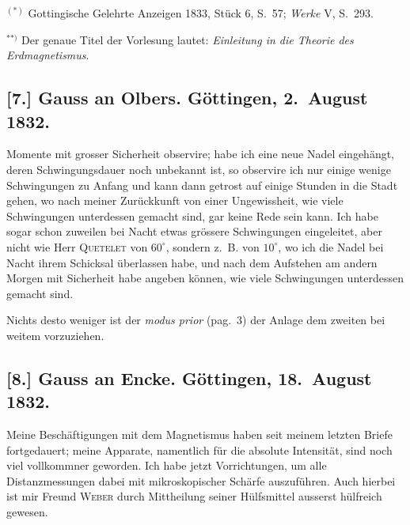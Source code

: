 \documentclass[12pt,a4paper]{article}
\begin{document}
\medskip\noindent
$^{(*)}$ Gottingische Gelehrte Anzeigen 1833, St\"uck 6, S.~57; \textit{Werke} V, S.~293.

$^{**)}$ Der genaue Titel der Vorlesung lautet: \textit{Einleitung in die Theorie des Erdmagnetismus}.

\subsection*{[7.] Gauss an Olbers. G\"ottingen, 2.~August 1832.}

Momente mit grosser Sicherheit observire; habe ich eine neue Nadel eingeh\"angt, deren Schwingungsdauer noch unbekannt ist, so observire ich nur einige wenige Schwingungen zu Anfang und kann dann getrost auf einige Stunden in die Stadt gehen, wo nach meiner Zur\"uckkunft von einer Ungewissheit, wie viele Schwingungen unterdessen gemacht sind, gar keine Rede sein kann. Ich habe sogar schon zuweilen bei Nacht etwas gr\"ossere Schwingungen eingeleitet, aber nicht wie Herr \textsc{Quetelet} von $60^\circ$, sondern z.~B. von $10^\circ$, wo ich die Nadel bei Nacht ihrem Schicksal \"uberlassen habe, und nach dem Aufstehen am andern Morgen mit Sicherheit habe angeben k\"onnen, wie viele Schwingungen unterdessen gemacht sind.

Nichts desto weniger ist der \textit{modus prior} (pag.~3) der Anlage dem zweiten bei weitem vorzuziehen.

\subsection*{[8.] Gauss an Encke. G\"ottingen, 18.~August 1832.}

Meine Besch\"aftigungen mit dem Magnetismus haben seit meinem letzten Briefe fortgedauert; meine Apparate, namentlich f\"ur die absolute Intensit\"at, sind noch viel vollkommner geworden. Ich habe jetzt Vorrichtungen, um alle Distanzmessungen dabei mit mikroskopischer Sch\"arfe auszuf\"uhren. Auch hierbei ist mir Freund \textsc{Weber} durch Mittheilung seiner H\"ulfsmittel ausserst h\"ulfreich gewesen.
\end{document}
